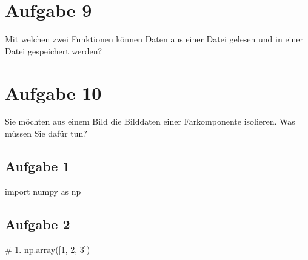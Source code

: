\documentclass[
  letterpaper,
  DIV=11,
  numbers=noendperiod]{scrreprt}
\newenvironment{Shaded}{\begin{snugshade}}{\end{snugshade}}
\newcommand{\CommentTok}[1]{\textcolor[rgb]{0.37,0.37,0.37}{#1}}
\newcommand{\DecValTok}[1]{\textcolor[rgb]{0.68,0.00,0.00}{#1}}
\newcommand{\ImportTok}[1]{\textcolor[rgb]{0.00,0.46,0.62}{#1}}
\newcommand{\NormalTok}[1]{\textcolor[rgb]{0.00,0.23,0.31}{#1}}
\begin{document}
\begin{tcolorbox}
\section*{Aufgabe 9}\label{aufgabe-9}


Mit welchen zwei Funktionen können Daten aus einer Datei gelesen und in
einer Datei gespeichert werden?

\section*{Aufgabe 10}\label{aufgabe-10}


Sie möchten aus einem Bild die Bilddaten einer Farkomponente isolieren.
Was müssen Sie dafür tun?

\begin{tcolorbox}[enhanced jigsaw, breakable, opacityback=0, left=2mm, coltitle=black, leftrule=.75mm, colframe=quarto-callout-caution-color-frame, opacitybacktitle=0.6, toprule=.15mm, bottomtitle=1mm, titlerule=0mm, toptitle=1mm, title={Lösung}, colbacktitle=quarto-callout-caution-color!10!white, arc=.35mm, bottomrule=.15mm, rightrule=.15mm, colback=white]

\subsection*{Aufgabe 1}\label{aufgabe-1-1}

\begin{Shaded}
\begin{Highlighting}[]
\ImportTok{import}\NormalTok{ numpy }\ImportTok{as}\NormalTok{ np}
\end{Highlighting}
\end{Shaded}

\subsection*{Aufgabe 2}\label{aufgabe-2-1}

\begin{Shaded}
\begin{Highlighting}[]
\CommentTok{\# 1.}
\NormalTok{np.array([}\DecValTok{1}\NormalTok{, }\DecValTok{2}\NormalTok{, }\DecValTok{3}\NormalTok{])}


\end{Highlighting}
\end{Shaded}
\end{tcolorbox}
\end{tcolorbox}
\end{document}
